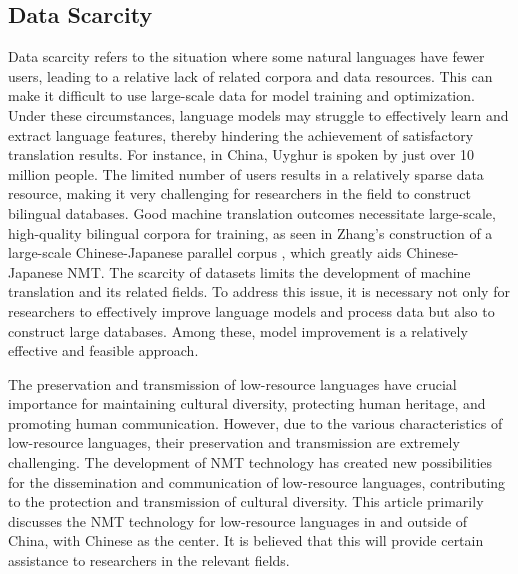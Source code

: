 \documentclass[acmsmall]{acmart}
\begin{document}
\subsection{Data Scarcity}

Data scarcity refers to the situation where some natural languages have fewer users, leading to a relative lack of related corpora and data resources. This can make it difficult to use large-scale data for model training and optimization. Under these circumstances, language models may struggle to effectively learn and extract language features, thereby hindering the achievement of satisfactory translation results. For instance, in China, Uyghur is spoken by just over 10 million people. The limited number of users results in a relatively sparse data resource, making it very challenging for researchers in the field to construct bilingual databases. Good machine translation outcomes necessitate large-scale, high-quality bilingual corpora for training, as seen in Zhang's construction of a large-scale Chinese-Japanese parallel corpus \cite{4five}, which greatly aids Chinese-Japanese NMT. The scarcity of datasets limits the development of machine translation and its related fields. To address this issue, it is necessary not only for researchers to effectively improve language models and process data but also to construct large databases. Among these, model improvement is a relatively effective and feasible approach.


The preservation and transmission of low-resource languages have crucial importance for maintaining cultural diversity, protecting human heritage, and promoting human communication. However, due to the various characteristics of low-resource languages, their preservation and transmission are extremely challenging. The development of NMT technology has created new possibilities for the dissemination and communication of low-resource languages, contributing to the protection and transmission of cultural diversity. This article primarily discusses the NMT technology for low-resource languages in and outside of China, with Chinese as the center. It is believed that this will provide certain assistance to researchers in the relevant fields.





\end{document}

